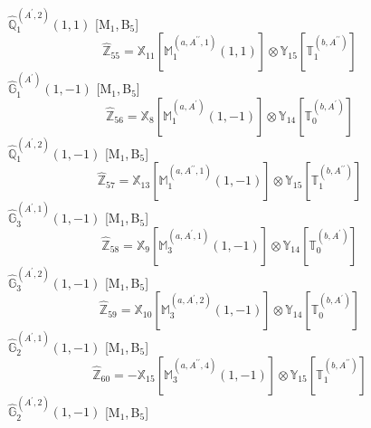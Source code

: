 \documentclass[fleqn,10pt,landscape]{article}
\begin{document}
\begin{itemize}
\begin{dmath*}
\end{dmath*}
\vspace{4mm}
\noindent {} $\,\,\,\hat{\mathbb{Q}}_{1}^{(A^{\prime},2)}(1,1)$ [M$_{1}$,\,B$_{5}$]
\begin{dmath*}
\hat{\mathbb{Z}}_{55}=\mathbb{X}_{11}[\mathbb{M}_{1}^{(a,A^{\prime\prime},1)}(1,1)] \otimes\mathbb{Y}_{15}[\mathbb{T}_{1}^{(b,A^{\prime\prime})}]
\end{dmath*}
\vspace{4mm}
\noindent {} $\,\,\,\hat{\mathbb{G}}_{1}^{(A^{\prime})}(1,-1)$ [M$_{1}$,\,B$_{5}$]
\begin{dmath*}
\hat{\mathbb{Z}}_{56}=\mathbb{X}_{8}[\mathbb{M}_{1}^{(a,A^{\prime})}(1,-1)] \otimes\mathbb{Y}_{14}[\mathbb{T}_{0}^{(b,A^{\prime})}]
\end{dmath*}
\vspace{4mm}
\noindent {} $\,\,\,\hat{\mathbb{Q}}_{1}^{(A^{\prime},2)}(1,-1)$ [M$_{1}$,\,B$_{5}$]
\begin{dmath*}
\hat{\mathbb{Z}}_{57}=\mathbb{X}_{13}[\mathbb{M}_{1}^{(a,A^{\prime\prime},1)}(1,-1)] \otimes\mathbb{Y}_{15}[\mathbb{T}_{1}^{(b,A^{\prime\prime})}]
\end{dmath*}
\vspace{4mm}
\noindent {} $\,\,\,\hat{\mathbb{G}}_{3}^{(A^{\prime},1)}(1,-1)$ [M$_{1}$,\,B$_{5}$]
\begin{dmath*}
\hat{\mathbb{Z}}_{58}=\mathbb{X}_{9}[\mathbb{M}_{3}^{(a,A^{\prime},1)}(1,-1)] \otimes\mathbb{Y}_{14}[\mathbb{T}_{0}^{(b,A^{\prime})}]
\end{dmath*}
\vspace{4mm}
\noindent {} $\,\,\,\hat{\mathbb{G}}_{3}^{(A^{\prime},2)}(1,-1)$ [M$_{1}$,\,B$_{5}$]
\begin{dmath*}
\hat{\mathbb{Z}}_{59}=\mathbb{X}_{10}[\mathbb{M}_{3}^{(a,A^{\prime},2)}(1,-1)] \otimes\mathbb{Y}_{14}[\mathbb{T}_{0}^{(b,A^{\prime})}]
\end{dmath*}
\vspace{4mm}
\noindent {} $\,\,\,\hat{\mathbb{G}}_{2}^{(A^{\prime},1)}(1,-1)$ [M$_{1}$,\,B$_{5}$]
\begin{dmath*}
\hat{\mathbb{Z}}_{60}=- \mathbb{X}_{15}[\mathbb{M}_{3}^{(a,A^{\prime\prime},4)}(1,-1)] \otimes\mathbb{Y}_{15}[\mathbb{T}_{1}^{(b,A^{\prime\prime})}]
\end{dmath*}
\vspace{4mm}
\noindent {} $\,\,\,\hat{\mathbb{G}}_{2}^{(A^{\prime},2)}(1,-1)$ [M$_{1}$,\,B$_{5}$]
\begin{dmath*}

\end{dmath*}
\end{itemize}
\end{document}
